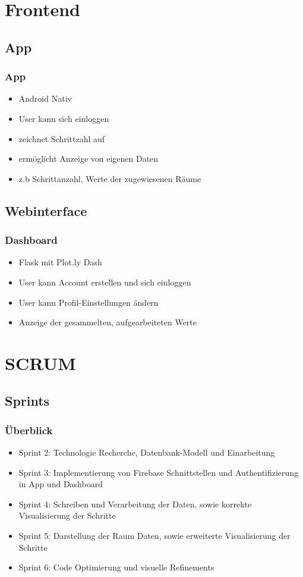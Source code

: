 \documentclass[11pt]{beamer}
\begin{document}
\section{Frontend}

\subsection{App}
\begin{frame}
\frametitle{App}
	\begin{itemize}
	\item Android Nativ
	\item User kann sich einloggen
	\item zeichnet Schrittzahl auf
	\item ermöglicht Anzeige von eigenen Daten
	\item z.b Schrittanzahl, Werte der zugewiesenen Räume
	\end{itemize}

\end{frame}

\subsection{Webinterface}
\begin{frame}
\frametitle{Dashboard}
	\begin{itemize}
	\item Flask mit Plot.ly Dash 
	\item User kann Account erstellen und sich einloggen
	\item User kann Profil-Einstellungen ändern
	\item Anzeige der gesammelten, aufgearbeiteten Werte
\end{itemize}
\end{frame}


\section{SCRUM}

\subsection{Sprints}
 
  \begin{frame}
 \frametitle{Überblick}
 \begin{itemize}
 	\item Sprint 2: Technologie Recherche, Datenbank-Modell und Einarbeitung
 	\item Sprint 3: Implementierung von Firebase Schnittstellen und Authentifizierung in App und Dashboard
 	\item Sprint 4: Schreiben und Verarbeitung der Daten, sowie korrekte Visualisierung der Schritte
 	\item Sprint 5: Darstellung der Raum Daten, sowie erweiterte Visualisierung der Schritte
 	\item Sprint 6: Code Optimierung und visuelle Refinements
 \end{itemize}
\end{frame}
\end{document}
